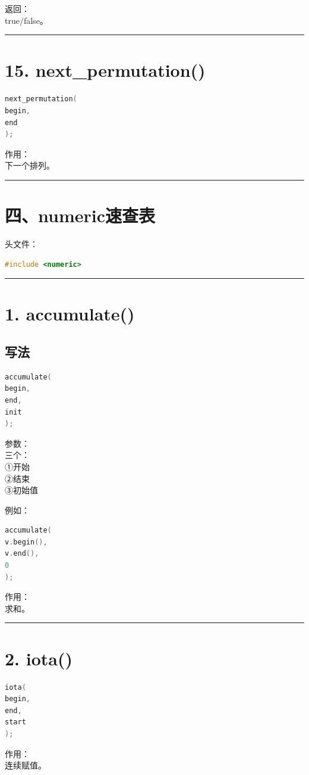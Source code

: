 \documentclass[9pt,twocolumn]{extarticle}
\begin{document}
返回：\\
true/false。

\noindent\rule{\linewidth}{0.4pt}

\section{15. next\_permutation()}
\begin{lstlisting}[language=C++]
next_permutation(
begin,
end
);
\end{lstlisting}
作用：\\
下一个排列。

\noindent\rule{\linewidth}{0.4pt}

\section{四、numeric速查表}

头文件：
\begin{lstlisting}[language=C++]
#include <numeric>
\end{lstlisting}

\noindent\rule{\linewidth}{0.4pt}

\section{1. accumulate()}

\subsection{写法}
\begin{lstlisting}[language=C++]
accumulate(
begin,
end,
init
);
\end{lstlisting}
参数：\\
三个：\\
①开始\\
②结束\\
③初始值

例如：
\begin{lstlisting}[language=C++]
accumulate(
v.begin(),
v.end(),
0
);
\end{lstlisting}
作用：\\
求和。

\noindent\rule{\linewidth}{0.4pt}

\section{2. iota()}
\begin{lstlisting}[language=C++]
iota(
begin,
end,
start
);
\end{lstlisting}
作用：\\
连续赋值。
\end{document}
